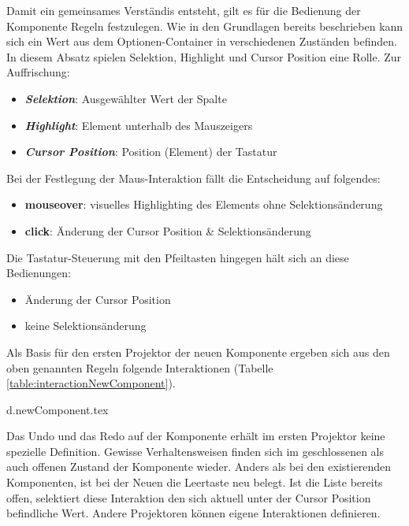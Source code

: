 Damit ein gemeinsames Verständis entsteht, gilt es für die Bedienung der Komponente Regeln festzulegen. 
Wie in den Grundlagen bereits beschrieben kann sich ein Wert aus dem Optionen-Container in verschiedenen Zuständen befinden. 
In diesem Absatz spielen Selektion, Highlight und Cursor Position eine Rolle. 
Zur Auffrischung: 

\begin{itemize}
    \item \textbf{\emph{Selektion}}: Ausgewählter Wert der Spalte
    \item \textbf{\emph{Highlight}}: Element unterhalb des Mauszeigers
    \item \textbf{\emph{Cursor Position}}: Position (Element) der Tastatur
\end{itemize}

\noindent
Bei der Festlegung der Maus-Interaktion fällt die Entscheidung auf folgendes: 

\begin{itemize}
    \item \textbf{mouseover}: visuelles Highlighting des Elements ohne Selektionsänderung
    \item \textbf{click}: Änderung der Cursor Position \& Selektionsänderung
\end{itemize}

\noindent
Die Tastatur-Steuerung mit den Pfeiltasten hingegen hält sich an diese Bedienungen: 

\begin{itemize}
    \item Änderung der Cursor Position
    \item keine Selektionsänderung
\end{itemize}

\noindent
Als Basis für den ersten Projektor der neuen Komponente ergeben sich aus den oben genannten Regeln folgende Interaktionen (Tabelle \ref{table:interactionNewComponent}). 

{d.newComponent.tex}

Das Undo und das Redo auf der Komponente erhält im ersten Projektor keine spezielle Definition. 
Gewisse Verhaltensweisen finden sich im geschlossenen als auch offenen Zustand der Komponente wieder. 
Anders als bei den existierenden Komponenten, ist bei der Neuen die Leertaste neu belegt. 
Ist die Liste bereits offen, selektiert diese Interaktion den sich aktuell unter der Cursor Position befindliche Wert. 
Andere Projektoren können eigene Interaktionen definieren. 



